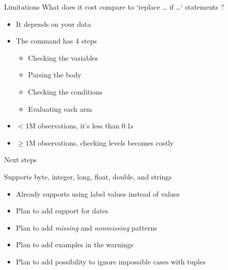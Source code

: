 \documentclass[11pt]{beamer}
\begin{document}
\begin{frame}{Limitations}
What does it cost compare to `replace … if …` statements ?
\begin{itemize}
    \item It depends on your data
    \item The command has 4 steps
    \begin{itemize}
        \item Checking the variables
        \item Parsing the body
        \item Checking the conditions
        \item Evaluating each arm
    \end{itemize}
    \item $< 1$M observations, it’s less than 0.1s
    \item $\geq 1$M observations, checking levels becomes costly
\end{itemize}

\end{frame}

\begin{frame}{Next steps}
\label{next_steps}

Supports byte, integer, long, float, double, and strings
\begin{itemize}
    \item Already supports using label values instead of values \hyperlink{example_9}{}
    \item Plan to add support for dates
    \item Plan to add \textit{missing} and \textit{nonmissing} patterns
    \item Plan to add examples in the warnings
    \item Plan to add possibility to ignore impossible cases with tuples
\end{itemize}
\end{frame}
\end{document}
